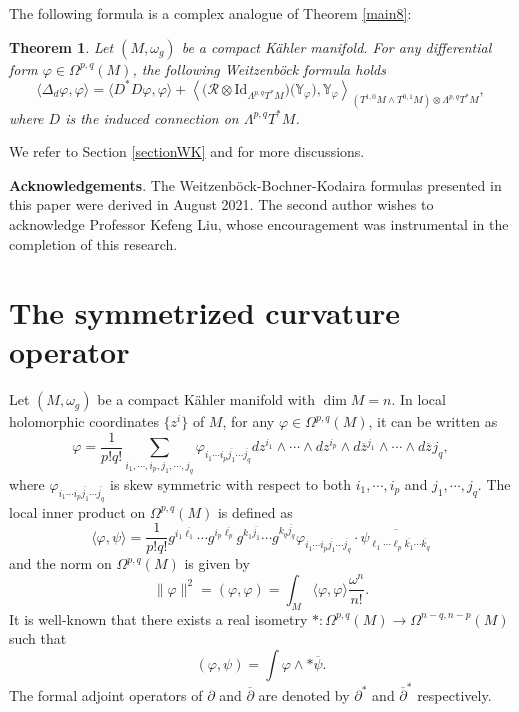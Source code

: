 \documentclass[12pt, reqno]{amsart}
\newcommand\bp{{\bar\partial}}
\theoremstyle{plain}
\newtheorem{thm}{Theorem}[section]
\theoremstyle{definition}
\newcommand{\btheorem}{\begin{thm}}
\newcommand{\etheorem}{\end{thm}}
\newcommand{\la}{\langle}
\newcommand{\ra}{\rangle}
\newcommand{\p}{\partial}
\renewcommand{\bar}{\overline}
\renewcommand{\phi}{\varphi}
\newcommand{\beq}{\begin{equation}}
\newcommand{\eeq}{\end{equation}}
\renewcommand{\bp}{\bar{\partial}}
\newcommand{\Om}{\Omega}
\renewcommand{\>}{\rightarrow}
\renewcommand{\#}{\sharp}
\numberwithin{equation}{section} %
\begin{document}
\noindent The following formula is a complex analogue of Theorem \ref{main8}:
\btheorem\label{main9} Let $(M,\omega_g)$ be a compact K\"ahler manifold. For any differential form $ \phi \in \Omega^{p,q}(M) $, the following Weitzenb\"ock formula  holds
\beq \langle\Delta_d \phi, \phi\rangle = \langle D^*D\phi, \phi\rangle + \left\langle \big(\mathscr{R}\otimes \mathrm{Id}_{\Lambda^{p,q}T^*M}\big)\big(\mathbb Y_\phi\big),\mathbb Y_\phi \right\rangle_{\left(T^{1,0}M \wedge T^{0,1}M\right) \otimes \Lambda^{p,q}T^*M }, \eeq
where $ D $ is the induced connection on $ \Lambda^{p,q}T^*M $.
\etheorem

\noindent We refer to Section \ref{sectionWK} and \cite{PetersenWink2021b} for more discussions.
\baselineskip


\noindent\textbf{Acknowledgements}. The Weitzenb\"ock-Bochner-Kodaira formulas presented in this paper were derived in August 2021. The second author wishes to acknowledge Professor Kefeng Liu, whose encouragement was instrumental in the completion of this research.

\baselineskip

\section{The symmetrized curvature operator}\label{sectionP}

Let $ (M,\omega_g) $ be a compact K\"ahler manifold with $\dim M= n$. In local holomorphic coordinates $\{z^i\}$ of $M$,  for any $\phi\in \Om^{p,q}(M)$,   it can be written as
\beq    \phi=\frac{1}{p!q!}\sum_{i_1,\cdots, i_p, j_1,\cdots,   j_q}\phi_{i_1\cdots i_p \bar{j_1}\cdots \bar{j_q}}dz^{i_1} \wedge   \cdots \wedge  dz^{i_p}\wedge d\bar z{}^{j_1}\wedge \cdots\wedge d\bar z^{}{j_q},\eeq
where  $\phi_{i_1\cdots i_p \bar{j_1}\cdots \bar{j_q}}$ is skew symmetric with respect to  both $i_1,\cdots, i_p$ and $j_1,\cdots, j_q$.
\noindent The {local inner product} on $\Om^{p,q}(M)$ is defined as
\beq    \label{localinnerproduct} \la\phi,\psi\ra=\frac{1}{p!q!}g^{i_1\bar {\ell_1}}\cdots g^{i_p\bar {\ell_p}}g^{k_1\bar {j_1}}\cdots g^{k_q\bar {j_q}} \phi_{i_1\cdots i_p \bar{j_1}\cdots \bar{j_q}}\cdot \bar{\psi_{\ell_1\cdots \ell_p \bar{k_1}\cdots \bar{k_q}}} \eeq
and the {norm} on $\Om^{p,q}(M)$ is given by
\beq \|\phi\|^2=(\phi,\phi)=\int_M \la\phi,\phi\ra\frac{\omega^n}{n!}.\eeq
It is well-known that there exists a real isometry $*:\Om^{p,q}(M)\>\Om^{n-q,n-p}(M)$ such that
\beq (\phi,\psi)=\int \phi\wedge *\bar\psi.\eeq
The formal adjoint operators of $\p$ and $\bp$  are denoted by $\p^*$ and $\bp^* $ respectively. \\
\end{document}
